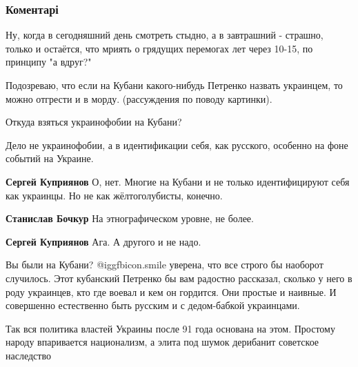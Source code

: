  
 
 
 
 
\subsubsection{Коментарі}
\label{sec:12_06_2018.fb.lesev_igor.1.nacia_idiotov.cmt}

\begin{itemize} %

Ну, когда в сегодняшний день смотреть стыдно, а в завтрашний - страшно, только
и остаётся, что мриять о грядущих перемогах лет через 10-15, по принципу "а
вдруг?"


Подозреваю, что если на Кубани какого-нибудь Петренко назвать украинцем, то
можно отгрести и в морду. (рассуждения по поводу картинки).

\begin{itemize} %
Откуда взяться украинофобии на Кубани?

Дело не украинофобии, а в идентификации себя, как русского, особенно на фоне событий на Украине.

\textbf{Сергей Куприянов} О, нет. Многие на Кубани и не только идентифицируют себя как украинцы. Но не как жёлтоголубисты, конечно.

\textbf{Станислав Бочкур} На этнографическом уровне, не более.

\textbf{Сергей Куприянов} Ага. А другого и не надо.


Вы были на Кубани?  @igg{fbicon.smile}  уверена, что все строго бы наоборот случилось. Этот
кубанский Петренко бы вам радостно рассказал, сколько у него в роду украинцев,
кто где воевал и кем он гордится. Они простые и наивные. И совершенно
естественно быть русским и с дедом-бабкой украинцами.

\end{itemize} %


Так вся политика властей Украины после 91 года основана на этом. Простому
народу впаривается национализм, а элита под шумок дерибанит советское
наследство


\end{itemize}
